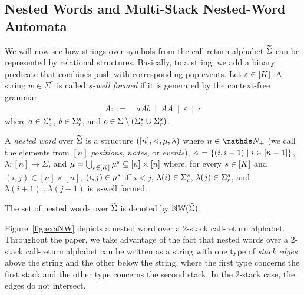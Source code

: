 \documentclass{LMCS}
\begin{document}
\subsection{Nested Words and Multi-Stack Nested-Word Automata}




We will now see how strings over symbols from the call-return alphabet
$\widetilde{\Sigma}$ can be represented by relational structures. Basically, to a
string, we add a binary predicate that combines push with corresponding pop
events.
Let $s \in [K]$. A string $w \in \Sigma^\ast$ is called
$s$-\emph{well formed} if it is generated by the context-free grammar
\begin{align*}
  A ::= &~ aAb ~\mid~ AA ~\mid~ \varepsilon ~\mid~ c
\end{align*}
where $a \in \Sigma_c^s$, $b \in \Sigma_r^s$, and $c \in \Sigma \setminus
(\Sigma_c^s \mathrel{\cup} \Sigma_r^s)$.

\begin{defi}
  A \emph{nested word} over $\widetilde{\Sigma}$ is a structure
  $([n],\mathord{\lessdot},\mu,\lambda)$ where $n \in \posN$ (we call the elements from
  $[n]$ \emph{positions}, \emph{nodes}, or \emph{events}), $\mathord{\lessdot}=\{(i,i+1)
  \mid i \in [n-1]\}$, $\lambda: [n] \rightarrow \Sigma$, and $\mu =
  \bigcup_{s \in [K]} \mu^s \subseteq [n] \times [n]$ where,
  for every $s \in [K]$ and $(i,j) \in [n] \times [n]$, $(i,j) \in
  \mu^s$ iff $i < j$, $\lambda(i) \in \Sigma_c^s$, $\lambda(j) \in
  \Sigma_r^s$, and $\lambda(i+1) \ldots \lambda(j-1)$ is $s$-well
  formed.
\end{defi}
\noindent
The set of nested words over $\widetilde{\Sigma}$ is denoted by $\mathbb{NW}(\widetilde{\Sigma})$.

Figure~\ref{fig:exaNW} depicts a nested word over a 2-stack call-return
alphabet. Throughout the paper, we take advantage of the fact that nested
words over a 2-stack call-return alphabet can be written as a string with one
type of \emph{stack edges} above the string and the other below the string,
where the first type concerns the first stack and the other type concerns the
second stack. In the 2-stack case, the edges do not intersect.
\end{document}
